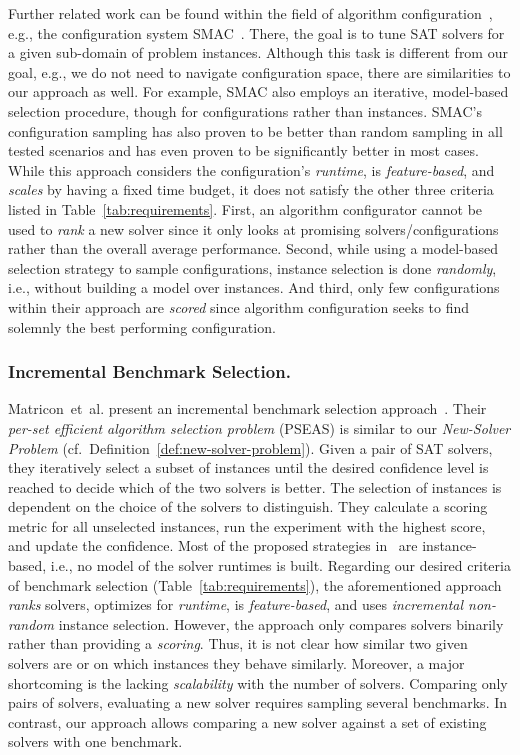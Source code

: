 \documentclass[runningheads]{llncs}
\begin{document}
Further related work can be found within the field of algorithm configuration~\cite{HoosHL21,Stutzle0P22}, e.g., the configuration system SMAC~\cite{HutterHL11}.
There, the goal is to tune SAT solvers for a given sub-domain of problem instances.
Although this task is different from our goal, e.g., we do not need to navigate configuration space, there are similarities to our approach as well.
For example, SMAC also employs an iterative, model-based selection procedure, though for configurations rather than instances.
SMAC's configuration sampling has also proven to be better than random sampling in all tested scenarios and has even proven to be significantly better in most cases.
While this approach considers the configuration's \emph{runtime}, is \emph{feature-based}, and \emph{scales} by having a fixed time budget, it does not satisfy the other three criteria listed in Table~\ref{tab:requirements}.
First, an algorithm configurator cannot be used to \emph{rank} a new solver since it only looks at promising solvers/configurations rather than the overall average performance.
Second, while using a model-based selection strategy to sample configurations, instance selection is done \emph{randomly}, i.e., without building a model over instances.
And third, only few configurations within their approach are \emph{scored} since algorithm configuration seeks to find solemnly the best performing configuration.

\subsubsection{Incremental Benchmark Selection.}

Matricon~et~al. present an incremental benchmark selection approach~\cite{MatriconAFSH21}.
Their \emph{per-set efficient algorithm selection problem} (PSEAS) is similar to our \emph{New-Solver Problem} (cf.~Definition~\ref{def:new-solver-problem}).
Given a pair of SAT solvers, they iteratively select a subset of instances until the desired confidence level is reached to decide which of the two solvers is better.
The selection of instances is dependent on the choice of the solvers to distinguish.
They calculate a scoring metric for all unselected instances, run the experiment with the highest score, and update the confidence.
Most of the proposed strategies in~\cite{MatriconAFSH21} are instance-based, i.e., no model of the solver runtimes is built.
Regarding our desired criteria of benchmark selection (Table~\ref{tab:requirements}), the aforementioned approach \emph{ranks} solvers, optimizes for \emph{runtime}, is \emph{feature-based}, and uses \emph{incremental non-random} instance selection.
However, the approach only compares solvers binarily rather than providing a \emph{scoring}.
Thus, it is not clear how similar two given solvers are or on which instances they behave similarly.
Moreover, a major shortcoming is the lacking \emph{scalability} with the number of solvers.
Comparing only pairs of solvers, evaluating a new solver requires sampling several benchmarks.
In contrast, our approach allows comparing a new solver against a set of existing solvers with one benchmark.
\end{document}
